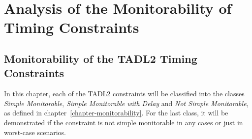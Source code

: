 \chapter{Analysis of the Monitorability of Timing Constraints}

\section{Monitorability of the TADL2 Timing Constraints}
	In this chapter, each of the TADL2 constraints will be classified into the classes \emph{Simple Monitorable}, \emph{Simple Monitorable with Delay} and \emph{Not Simple Monitorable}, as defined in chapter~\ref{chapter-monitorability}. For the last class, it will be demonstrated if the constraint is not simple monitorable in any cases or just in worst-case scenarios.

